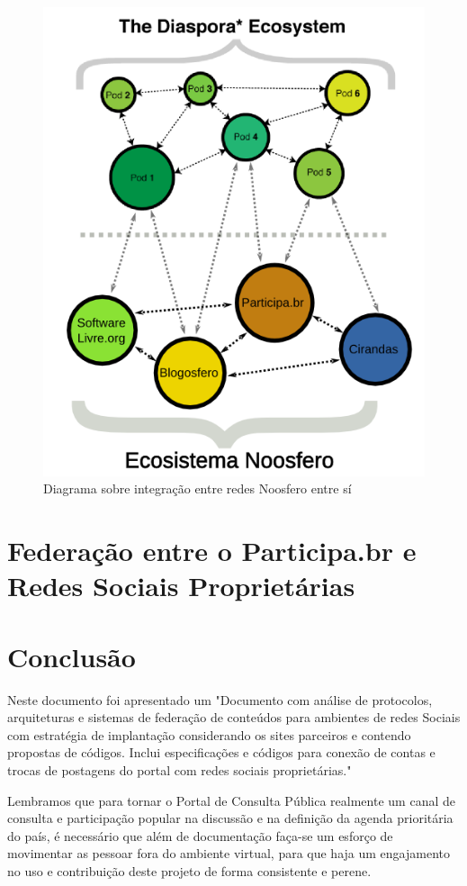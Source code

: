 \documentclass[12pt]{article}
\newcommand{\ProductDescription}{"Documento com análise de protocolos,
  arquiteturas e sistemas de federação de conteúdos para ambientes de redes
  Sociais com estratégia de implantação considerando os sites parceiros e
  contendo propostas de códigos. Inclui especificações e códigos para conexão
  de contas e trocas de postagens do portal com redes sociais proprietárias."
}
\begin{document}
\begin{figure}[h]
\center
\includegraphics[scale=0.4]{ecosistema-noosfero-diaspora-v2.png}
\caption{Diagrama sobre integração entre redes Noosfero entre sí}
\label{ecosistema-v2}
\end{figure}

\section{Federação entre o Participa.br e Redes Sociais Proprietárias}


\section{Conclusão}

Neste documento foi apresentado um \ProductDescription

%
%

Lembramos que para tornar o Portal de Consulta Pública realmente um canal de
consulta e participação popular na discussão e na definição da agenda
prioritária do país, é necessário que além de documentação faça-se um esforço
de movimentar as pessoar fora do ambiente virtual, para que haja um
engajamento no uso e contribuição deste projeto de forma consistente e perene.

\newpage

\newpage
\listoffigures
\newpage
\printindex
\newpage

\newpage
\appendix
\appendixpage

\end{document}
